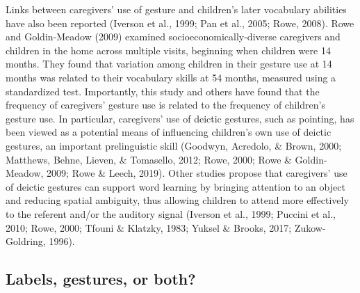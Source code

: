 \documentclass[
  man,floatsintext]{apa6}
\begin{document}
Links between caregivers' use of gesture and children's later vocabulary abilities have also been reported (Iverson et al., 1999; Pan et al., 2005; Rowe, 2008). Rowe and Goldin-Meadow (2009) examined socioeconomically-diverse caregivers and children in the home across multiple visits, beginning when children were 14 months. They found that variation among children in their gesture use at 14 months was related to their vocabulary skills at 54 months, measured using a standardized test. Importantly, this study and others have found that the frequency of caregivers' gesture use is related to the frequency of children's gesture use. In particular, caregivers' use of deictic gestures, such as pointing, has been viewed as a potential means of influencing children's own use of deictic gestures, an important prelinguistic skill (Goodwyn, Acredolo, \& Brown, 2000; Matthews, Behne, Lieven, \& Tomasello, 2012; Rowe, 2000; Rowe \& Goldin-Meadow, 2009; Rowe \& Leech, 2019). Other studies propose that caregivers' use of deictic gestures can support word learning by bringing attention to an object and reducing spatial ambiguity, thus allowing children to attend more effectively to the referent and/or the auditory signal (Iverson et al., 1999; Puccini et al., 2010; Rowe, 2000; Tfouni \& Klatzky, 1983; Yuksel \& Brooks, 2017; Zukow-Goldring, 1996).

\hypertarget{labels-gestures-or-both}{%
\subsection{Labels, gestures, or both?}\label{labels-gestures-or-both}}
\end{document}
